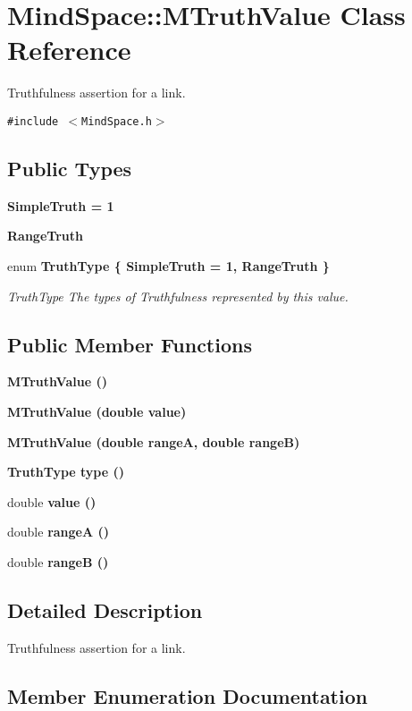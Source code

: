 \section{Mind\-Space::MTruth\-Value Class Reference}
\label{classMindSpace_1_1MTruthValue}
Truthfulness assertion for a link.  


{\tt \#include $<$Mind\-Space.h$>$}

\subsection*{Public Types}
\begin{CompactItemize}
\item 
\bf{Simple\-Truth} = 1
\item 
\bf{Range\-Truth}
\item 
enum \bf{Truth\-Type} \{ \bf{Simple\-Truth} =  1, 
\bf{Range\-Truth}
 \}
\begin{CompactList}\small\item\em Truth\-Type The types of Truthfulness represented by this value. \item\end{CompactList}\end{CompactItemize}
\subsection*{Public Member Functions}
\begin{CompactItemize}
\item 
\bf{MTruth\-Value} ()
\item 
\bf{MTruth\-Value} (double value)
\item 
\bf{MTruth\-Value} (double range\-A, double range\-B)
\item 
\bf{Truth\-Type} \bf{type} ()
\item 
double \bf{value} ()
\item 
double \bf{range\-A} ()
\item 
double \bf{range\-B} ()
\end{CompactItemize}


\subsection{Detailed Description}
Truthfulness assertion for a link. 



\subsection{Member Enumeration Documentation}
